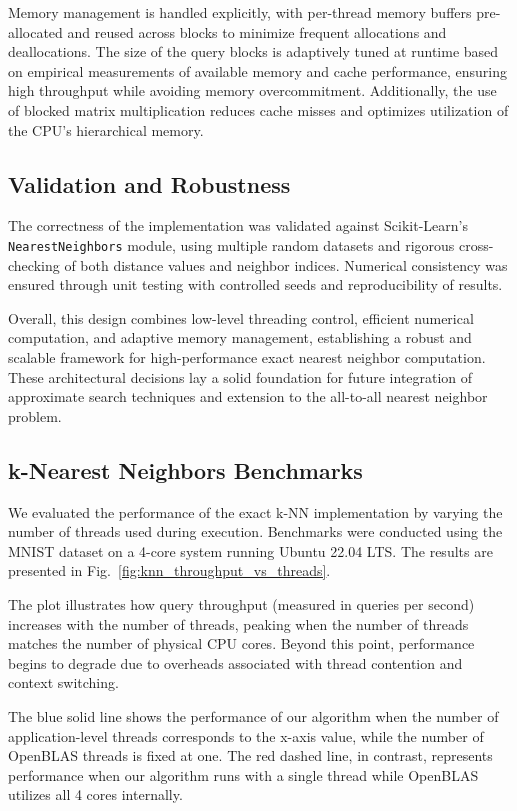 \documentclass[conference]{IEEEtran}
\begin{document}
Memory management is handled explicitly, with per-thread memory buffers pre-allocated and reused across 
blocks to minimize frequent allocations and deallocations. The size of the query blocks is adaptively 
tuned at runtime based on empirical measurements of available memory and cache performance, ensuring high 
throughput while avoiding memory overcommitment. Additionally, the use of blocked matrix multiplication 
reduces cache misses and optimizes utilization of the CPU’s hierarchical memory.

\subsection{Validation and Robustness}

The correctness of the implementation was validated against Scikit-Learn’s \texttt{NearestNeighbors} module, 
using multiple random datasets and rigorous cross-checking of both distance values and neighbor indices. 
Numerical consistency was ensured through unit testing with controlled seeds and reproducibility of results.

Overall, this design combines low-level threading control, efficient numerical computation, and adaptive memory 
management, establishing a robust and scalable framework for high-performance exact nearest neighbor computation. 
These architectural decisions lay a solid foundation for future integration of approximate search techniques and 
extension to the all-to-all nearest neighbor problem.


\subsection{k-Nearest Neighbors Benchmarks}

We evaluated the performance of the exact k-NN implementation by varying the number of threads used during 
execution. Benchmarks were conducted using the MNIST dataset on a 4-core system running Ubuntu 22.04 LTS. 
The results are presented in Fig.~\ref{fig:knn_throughput_vs_threads}.

The plot illustrates how query throughput (measured in queries per second) increases with the number of threads,
peaking when the number of threads matches the number of physical CPU cores. Beyond this point, performance 
begins to degrade due to overheads associated with thread contention and context switching.

The blue solid line shows the performance of our algorithm when the number of application-level threads corresponds
to the x-axis value, while the number of OpenBLAS threads is fixed at one. The red dashed line, in contrast, 
represents performance when our algorithm runs with a single thread while OpenBLAS utilizes all 4 cores internally.
\end{document}
